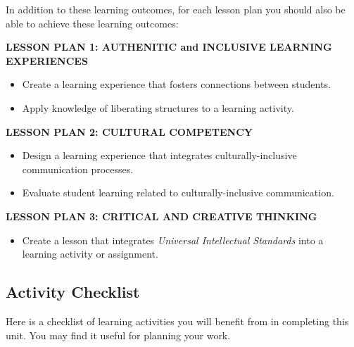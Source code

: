 \documentclass[
]{book}
\providecommand{\tightlist}{%
  \setlength{\itemsep}{0pt}\setlength{\parskip}{0pt}}
\begin{document}
In addition to these learning outcomes, for each lesson plan you should also be able to achieve these learning outcomes:

\textbf{LESSON PLAN 1: AUTHENITIC and INCLUSIVE LEARNING EXPERIENCES}

\begin{itemize}
\tightlist
\item
  Create a learning experience that fosters connections between students.\\
\item
  Apply knowledge of liberating structures to a learning activity.
\end{itemize}

\textbf{LESSON PLAN 2: CULTURAL COMPETENCY}

\begin{itemize}
\tightlist
\item
  Design a learning experience that integrates culturally-inclusive communication processes.\\
\item
  Evaluate student learning related to culturally-inclusive communication.
\end{itemize}

\textbf{LESSON PLAN 3: CRITICAL AND CREATIVE THINKING}

\begin{itemize}
\tightlist
\item
  Create a lesson that integrates \emph{Universal Intellectual Standards} into a learning activity or assignment.
\end{itemize}

\hypertarget{activity-checklist-3}{%
\subsection*{Activity Checklist}\label{activity-checklist-3}}

Here is a checklist of learning activities you will benefit from in completing this unit. You may find it useful for planning your work.
\end{document}

